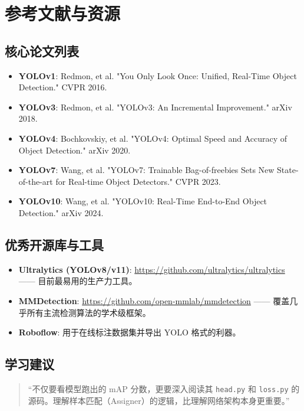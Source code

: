 \documentclass[11pt,a4paper]{article}
\begin{document}
\section{参考文献与资源}

\subsection{核心论文列表}
\begin{itemize}
    \item \textbf{YOLOv1}: Redmon, et al. "You Only Look Once: Unified, Real-Time Object Detection." CVPR 2016.
    \item \textbf{YOLOv3}: Redmon, et al. "YOLOv3: An Incremental Improvement." arXiv 2018.
    \item \textbf{YOLOv4}: Bochkovskiy, et al. "YOLOv4: Optimal Speed and Accuracy of Object Detection." arXiv 2020.
    \item \textbf{YOLOv7}: Wang, et al. "YOLOv7: Trainable Bag-of-freebies Sets New State-of-the-art for Real-time Object Detectors." CVPR 2023.
    \item \textbf{YOLOv10}: Wang, et al. "YOLOv10: Real-Time End-to-End Object Detection." arXiv 2024.
\end{itemize}

\subsection{优秀开源库与工具}
\begin{itemize}
    \item \textbf{Ultralytics (YOLOv8/v11)}: \url{https://github.com/ultralytics/ultralytics} —— 目前最易用的生产力工具。
    \item \textbf{MMDetection}: \url{https://github.com/open-mmlab/mmdetection} —— 覆盖几乎所有主流检测算法的学术级框架。
    \item \textbf{Roboflow}: 用于在线标注数据集并导出 YOLO 格式的利器。
\end{itemize}

\subsection{学习建议}
\begin{quote}
    “不仅要看模型跑出的 mAP 分数，更要深入阅读其 \texttt{head.py} 和 \texttt{loss.py} 的源码。理解样本匹配（Assigner）的逻辑，比理解网络架构本身更重要。”
\end{quote}
\end{document}
